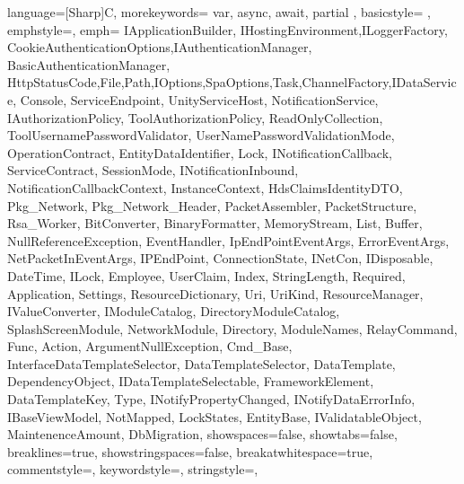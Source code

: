 {
	language=[Sharp]C,
	morekeywords={ var, async, await, partial }, %
	basicstyle=\ttfamily \color{black} \small \smaller,
	emphstyle={\color{vs_class}},
	emph={ IApplicationBuilder, IHostingEnvironment,ILoggerFactory, CookieAuthenticationOptions,IAuthenticationManager, BasicAuthenticationManager, HttpStatusCode,File,Path,IOptions,SpaOptions,Task,ChannelFactory,IDataService, Console, ServiceEndpoint, UnityServiceHost, NotificationService, IAuthorizationPolicy, ToolAuthorizationPolicy, ReadOnlyCollection, ToolUsernamePasswordValidator, UserNamePasswordValidationMode, OperationContract, EntityDataIdentifier, Lock, INotificationCallback, ServiceContract, SessionMode, INotificationInbound, NotificationCallbackContext, InstanceContext, HdsClaimsIdentityDTO, Pkg_Network, Pkg_Network_Header, PacketAssembler, PacketStructure, Rsa_Worker, BitConverter, BinaryFormatter, MemoryStream, List, Buffer, NullReferenceException, EventHandler, IpEndPointEventArgs, ErrorEventArgs, NetPacketInEventArgs, IPEndPoint, ConnectionState, INetCon, IDisposable, DateTime, ILock, Employee, UserClaim, Index, StringLength, Required, Application, Settings, ResourceDictionary, Uri, UriKind, ResourceManager, IValueConverter, IModuleCatalog, DirectoryModuleCatalog, SplashScreenModule, NetworkModule, Directory, ModuleNames, RelayCommand, Func, Action, ArgumentNullException, Cmd_Base, InterfaceDataTemplateSelector, DataTemplateSelector, DataTemplate, DependencyObject, IDataTemplateSelectable, FrameworkElement, DataTemplateKey, Type, INotifyPropertyChanged, INotifyDataErrorInfo, IBaseViewModel, NotMapped, LockStates, EntityBase, IValidatableObject, MaintenenceAmount, DbMigration}, %
	showspaces=false,
	showtabs=false,
	breaklines=true,
	showstringspaces=false,
	breakatwhitespace=true,
	commentstyle=\color{vs_comment},
	keywordstyle=\color{vs_keyword},
	stringstyle=\color{vs_string},
}

